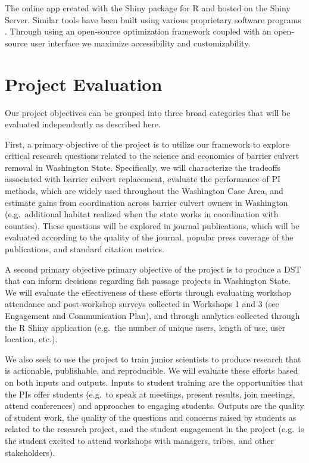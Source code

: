 The online app created with the Shiny package for R and hosted on the Shiny Server. Similar tools have been built using various proprietary software programs \citep{ohanley_optipass_2015, moody_pet_2017}. Through using an open-source optimization framework coupled with an open-source user interface we maximize accessibility and customizability. 


\section{Project Evaluation}

Our project objectives can be grouped into three broad categories that will be evaluated independently as described here. 

First, a primary objective of the project is to utilize our framework to explore critical research questions related to the science and economics of barrier culvert removal in Washington State. Specifically, we will characterize the tradeoffs associated with barrier culvert replacement, evaluate the performance of PI methods, which are widely used throughout the Washington Case Area, and estimate gains from coordination across barrier culvert owners in Washington (e.g.\ additional habitat realized when the state works in coordination with counties). These questions will be explored in journal publications, which will be evaluated according to the quality of the journal, popular press coverage of the publications, and standard citation metrics.


A second primary objective primary objective of the project is to produce a DST that can inform decisions regarding fish passage projects in Washington State.  We will evaluate the effectiveness of these efforts through evaluating workshop attendance and post-workshop surveys collected in Workshops 1 and 3 (see Engagement and Communication Plan), and through analytics collected through the R Shiny application (e.g.\ the number of unique users, length of use, user location, etc.).

We also seek to use the project to train junior scientists to produce research that is actionable, publishable, and reproducible. We will evaluate these efforts based on both inputs and outputs. Inputs to student training are the opportunities that the PIs offer students (e.g.\ to speak at meetings, present results, join meetings, attend conferences) and approaches to engaging students. Outputs are the quality of student work, the quality of the questions and concerns raised by students as related to the research project, and the student engagement in the project (e.g.\ is the student excited to attend workshops with managers, tribes, and other stakeholders). 

